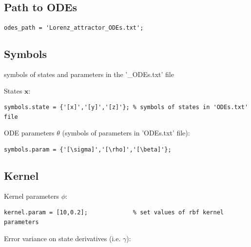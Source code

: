 \begin{par}
\subsection{ Path to ODEs }
\end{par} \vspace{1em}
\color{RoyalPurple}\begin{verbatim}
odes_path = 'Lorenz_attractor_ODEs.txt';
\end{verbatim}
\color{black}
\begin{par}
\subsection{ Symbols } symbols of states and parameters in the '\_ODEs.txt' file
\end{par} \vspace{1em}
\begin{par}
States $\mathbf{x}$:
\end{par} \vspace{1em}
\color{RoyalPurple}\begin{verbatim}
symbols.state = {'[x]','[y]','[z]'}; % symbols of states in 'ODEs.txt' file
\end{verbatim}
\color{black}
\begin{par}
ODE parameters $\theta$ (symbols of parameters in 'ODEs.txt' file):
\end{par} \vspace{1em}
\color{RoyalPurple}\begin{verbatim}
symbols.param = {'[\sigma]','[\rho]','[\beta]'};
\end{verbatim}
\color{black}
\begin{par}
\subsection{ Kernel }
\end{par} \vspace{1em}
\begin{par}
Kernel parameters $\phi$:
\end{par} \vspace{1em}
\color{RoyalPurple}\begin{verbatim}
kernel.param = [10,0.2];             % set values of rbf kernel parameters
\end{verbatim}
\color{black}
\begin{par}
Error variance on state derivatives (i.e. $\gamma$):
\end{par} \vspace{1em}
